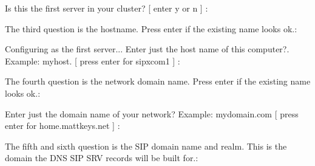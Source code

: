 \documentclass[letterpaper,10pt,english]{sphinxmanual}
\begin{document}
\begin{sphinxVerbatim}[commandchars=\\\{\}]
Is this the first server in your cluster? [ enter \PYGZsq{}y\PYGZsq{} or \PYGZsq{}n\PYGZsq{} ] :
\end{sphinxVerbatim}

The third question is the hostname. Press enter if the existing name looks ok.:

\begin{sphinxVerbatim}[commandchars=\\\{\}]
Configuring as the first server...
Enter just the host name of this computer?. Example: myhost. [ press enter for \PYGZsq{}sipxcom1\PYGZsq{} ] :
\end{sphinxVerbatim}

The fourth question is the network domain name. Press enter if the existing name looks ok.:

\begin{sphinxVerbatim}[commandchars=\\\{\}]
Enter just the domain name of your network? Example: mydomain.com [ press enter for \PYGZsq{}home.mattkeys.net\PYGZsq{} ] :
\end{sphinxVerbatim}

The fifth and sixth question is the SIP domain name and realm. This is the domain the DNS SIP SRV records will be built for.:

\begin{sphinxVerbatim}[commandchars=\\\{\}]
         
                
            
    \PYG{p}{[}     \PYG{p}{]} 
   \PYG{p}{[}     \PYG{p}{]} 
\end{sphinxVerbatim}
\end{document}
